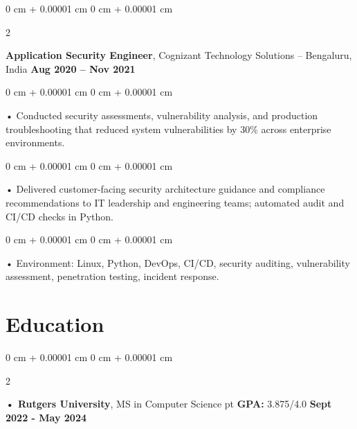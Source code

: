 \documentclass[10pt, letterpaper]{article}
\newenvironment{onecolentry}{
    \begin{adjustwidth}{
        0 cm + 0.00001 cm
    }{
        0 cm + 0.00001 cm
    }
}{
    \end{adjustwidth}
} %
\newenvironment{twocolentry}[2][]{
    \onecolentry
    \def\secondColumn{#2}
    \setcolumnwidth{\fill, 4.5 cm}
    \begin{paracol}{2}
}{
    \switchcolumn \raggedleft \secondColumn
    \end{paracol}
    \endonecolentry
} %
\begin{document}
        \begin{twocolentry}{
            \textbf{Aug 2020 – Nov 2021}
        }
            \vspace{2 pt }
            \textbf{Application Security Engineer}, Cognizant Technology Solutions -- Bengaluru, India\end{twocolentry}
        \begin{onecolentry}
             • Conducted security assessments, vulnerability analysis, and production troubleshooting that reduced system vulnerabilities by 30\% across enterprise environments.
        \end{onecolentry}
        \begin{onecolentry}
             • Delivered customer-facing security architecture guidance and compliance recommendations to IT leadership and engineering teams; automated audit and CI/CD checks in Python.
        \end{onecolentry}
        \begin{onecolentry}
             • Environment: Linux, Python, DevOps, CI/CD, security auditing, vulnerability assessment, penetration testing, incident response.
        \end{onecolentry}
    \vspace{2 pt }
        \section{Education}
        \vspace{2 pt }
        \begin{twocolentry}{
            \textbf{Sept 2022 - May 2024}
        }
            \textbf{ • Rutgers University}, MS in Computer Science  pt \textbf{GPA:} 3.875/4.0  \end{twocolentry}
\end{document}
